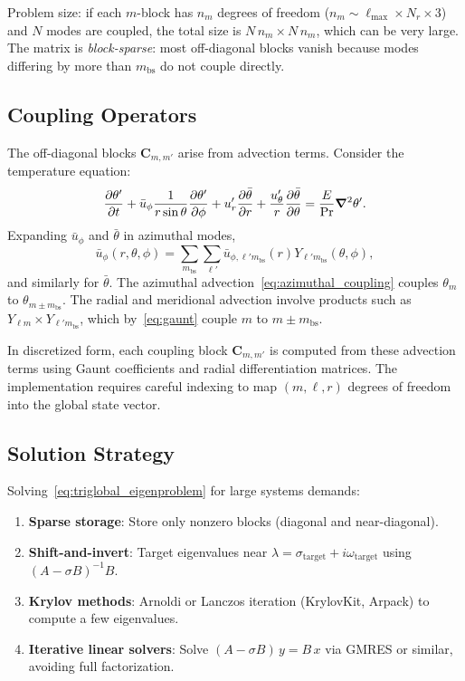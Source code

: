 \documentclass[11pt]{article}
\numberwithin{equation}{section}
\begin{document}
Problem size: if each $m$-block has $n_m$ degrees of freedom ($n_m \sim \ell_{\max}\times N_r\times3$) and $N$ modes are coupled, the total size is $N\,n_m \times N\,n_m$, which can be very large. The matrix is \emph{block-sparse}: most off-diagonal blocks vanish because modes differing by more than $m_{\text{bs}}$ do not couple directly.

\subsection{Coupling Operators}

The off-diagonal blocks $\bm{C}_{m,m'}$ arise from advection terms. Consider the temperature equation:
\begin{equation}
  \pdv{\theta'}{t} + \bar{u}_\phi \frac{1}{r\sin\theta}\pdv{\theta'}{\phi}
  + u_r' \pdv{\bar{\theta}}{r} + \frac{u_\theta'}{r}\pdv{\bar{\theta}}{\theta}
  = \frac{E}{\mathrm{Pr}} \grad^2 \theta'.
  \label{eq:temp_coupled}
\end{equation}
Expanding $\bar{u}_\phi$ and $\bar{\theta}$ in azimuthal modes,
\[
  \bar{u}_\phi(r,\theta,\phi) = \sum_{m_{\text{bs}}} \sum_{\ell'} \bar{u}_{\phi,\ell'm_{\text{bs}}}(r) Y_{\ell' m_{\text{bs}}}(\theta,\phi),
\]
and similarly for $\bar{\theta}$. The azimuthal advection~\eqref{eq:azimuthal_coupling} couples $\theta_m$ to $\theta_{m\pm m_{\text{bs}}}$. The radial and meridional advection involve products such as $Y_{\ell m} \times Y_{\ell' m_{\text{bs}}}$, which by~\eqref{eq:gaunt} couple $m$ to $m\pm m_{\text{bs}}$.

In discretized form, each coupling block $\bm{C}_{m,m'}$ is computed from these advection terms using Gaunt coefficients and radial differentiation matrices. The implementation requires careful indexing to map $(m,\ell,r)$ degrees of freedom into the global state vector.

\subsection{Solution Strategy}

Solving~\eqref{eq:triglobal_eigenproblem} for large systems demands:
\begin{enumerate}
  \item \textbf{Sparse storage}: Store only nonzero blocks (diagonal and near-diagonal).
  \item \textbf{Shift-and-invert}: Target eigenvalues near $\lambda=\sigma_{\text{target}}+i\omega_{\text{target}}$ using $(A-\sigma B)^{-1}B$.
  \item \textbf{Krylov methods}: Arnoldi or Lanczos iteration (KrylovKit, Arpack) to compute a few eigenvalues.
  \item \textbf{Iterative linear solvers}: Solve $(A-\sigma B)\,y = B\,x$ via GMRES or similar, avoiding full factorization.
\end{enumerate}
\end{document}
